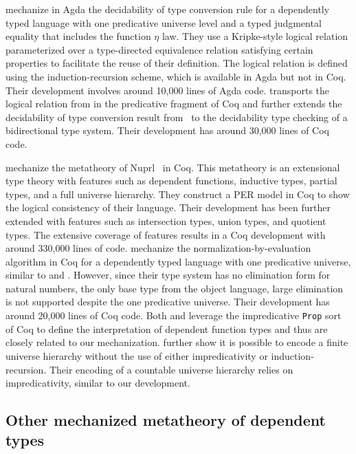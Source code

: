 \documentclass[\ifpublic nolinenum\else\fi,online,OA]{jfp}
\theoremstyle{definition}
\begin{document}
\citet{decagda} mechanize in Agda the decidability of type
conversion rule for a dependently typed language with one predicative
universe level and a typed judgmental equality that includes the function
$\eta$ law. They
use a Kripke-style logical relation parameterized over a
type-directed equivalence relation satisfying certain
properties to facilitate the reuse of their definition. The
logical relation is defined using the induction-recursion scheme,
which is available in Agda but not in Coq. Their development involves
around 10,000 lines of Agda code.
\citet{martin-lof-a-la-coq} transports the logical relation
from \citet{decagda} in the predicative fragment of Coq and further
extends the decidability of type conversion result
from~\citet{decagda} to the decidability type checking of a
bidirectional type system. Their development has around
30,000 lines of Coq code.

\citet{anand2014towards} mechanize the metatheory of
Nuprl~\citep{constable1986implementing} in Coq. This metatheory is an
extensional type theory with features such as dependent functions,
inductive types, partial types, and a full universe hierarchy. They construct a PER
model in Coq to show the logical consistency of their language. Their
development has been further extended with features such as
intersection types, union types, and quotient types. The extensive
coverage of features results in a Coq development with around
330,000 lines of code.
\citet{nbeincoq}
mechanize the normalization-by-evaluation algorithm in Coq for a
dependently typed language with one predicative universe, similar to
\citet{decagda} and \citet{martin-lof-a-la-coq}. However, since their
type system has no elimination form for natural numbers, the
only base type from the object language, large elimination is not
supported despite the one predicative universe. Their development has
around 20,000 lines of Coq code.
Both \citet{anand2014towards} and \citet{nbeincoq} leverage the
impredicative \texttt{Prop} sort of Coq to define the interpretation
of dependent function types and thus are closely related to our
mechanization. \citet{anand2014towards} further show it is possible
to encode a finite universe hierarchy without the use of
either impredicativity or induction-recursion. Their encoding of a countable
universe hierarchy relies on impredicativity, similar to our
development.

\subsection{Other mechanized metatheory of dependent types}
\end{document}
